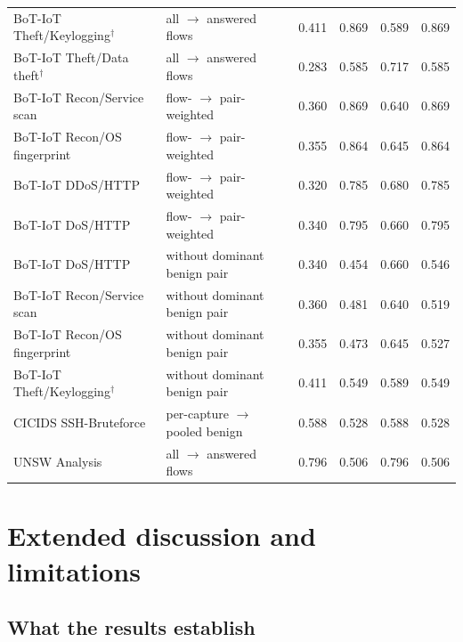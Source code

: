 \documentclass[preprint,12pt]{elsarticle}
\begin{document}
\begin{table}[H]
{\begin{tabular}{llcccc}
BoT-IoT Theft/Keylogging$^\dagger$ & all $\to$ answered flows & 0.411 & 0.869 & 0.589 & 0.869 \\
BoT-IoT Theft/Data theft$^\dagger$ & all $\to$ answered flows & 0.283 & 0.585 & 0.717 & 0.585 \\
BoT-IoT Recon/Service scan & flow- $\to$ pair-weighted & 0.360 & 0.869 & 0.640 & 0.869 \\
BoT-IoT Recon/OS fingerprint & flow- $\to$ pair-weighted & 0.355 & 0.864 & 0.645 & 0.864 \\
BoT-IoT DDoS/HTTP & flow- $\to$ pair-weighted & 0.320 & 0.785 & 0.680 & 0.785 \\
BoT-IoT DoS/HTTP  & flow- $\to$ pair-weighted & 0.340 & 0.795 & 0.660 & 0.795 \\
\midrule
BoT-IoT DoS/HTTP & without dominant benign pair & 0.340 & 0.454 & 0.660 & 0.546 \\
BoT-IoT Recon/Service scan & without dominant benign pair & 0.360 & 0.481 & 0.640 & 0.519 \\
BoT-IoT Recon/OS fingerprint & without dominant benign pair & 0.355 & 0.473 & 0.645 & 0.527 \\
BoT-IoT Theft/Keylogging$^\dagger$ & without dominant benign pair & 0.411 & 0.549 & 0.589 & 0.549 \\
CICIDS SSH-Bruteforce & per-capture $\to$ pooled benign & 0.588 & 0.528 & 0.588 & 0.528 \\
UNSW Analysis & all $\to$ answered flows & 0.796 & 0.506 & 0.796 & 0.506 \\
\bottomrule
\end{tabular}}
\end{table}

\section{Extended discussion and limitations}\label{sec:discussion}

\subsection{What the results establish}\label{sec:disc-established}
\end{document}
